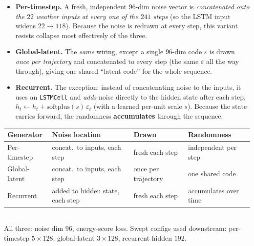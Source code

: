 \documentclass[11pt]{article}
\begin{document}
\begin{itemize}
\item \textbf{Per-timestep.} A fresh, independent $96$-dim noise vector is
\emph{concatenated onto the $22$ weather inputs at every one of the $241$ steps} (so the
LSTM input widens $22\!\to\!118$). Because the noise is redrawn at every step, this variant
resists collapse most effectively of the three.
\item \textbf{Global-latent.} The \emph{same} wiring, except a single $96$-dim code $\varepsilon$ is
drawn \emph{once per trajectory} and concatenated to every step (the same $\varepsilon$ all the way
through), giving one shared ``latent code'' for the whole sequence.
\item \textbf{Recurrent.} The exception: instead of concatenating noise to the inputs,
it uses an \texttt{LSTMCell} and \emph{adds} noise directly to the hidden state after each
step, $h_t \leftarrow h_t + \mathrm{softplus}(s)\,\varepsilon_t$ (with a learned per-unit
scale $s$). Because the state carries forward, the randomness \textbf{accumulates} through
the sequence.
\end{itemize}

\begin{center}
\begin{tabular}{llll}
\toprule
Generator & Noise location & Drawn & Randomness \\
\midrule
Per-timestep  & concat.\ to inputs, each step & fresh each step      & independent per step \\
Global-latent & concat.\ to inputs, each step & once per trajectory  & one shared code \\
Recurrent     & added to hidden state, each step & fresh each step   & accumulates over time \\
\bottomrule
\end{tabular}\\[2pt]
{\footnotesize All three: noise dim $96$, energy-score loss. Swept configs used downstream:
per-timestep $5{\times}128$, global-latent $3{\times}128$, recurrent hidden $192$.}
\end{center}
\end{document}
